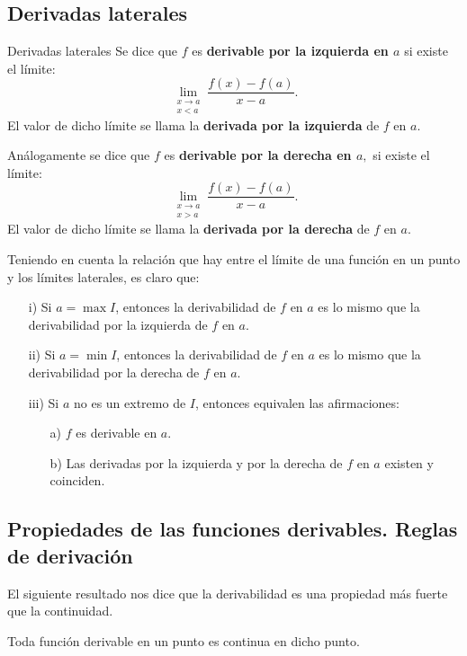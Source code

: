\subsection{Derivadas laterales}

\begin{defi}{Derivadas laterales}{} Se dice que $f$ es \textbf{derivable
por la izquierda en $a$} si existe el límite: 
\[
\lim_{\substack{x\to a\\
x<a
}
}\frac{f(x)-f(a)}{x-a}.
\]
El valor de dicho límite se llama la \textbf{derivada por la izquierda}
de $f$ en $a$.

Análogamente se dice que $f$ es \textbf{derivable por la derecha
en $a,$} si existe el límite: 
\[
\lim_{\substack{x\to a\\
x>a
}
}\frac{f(x)-f(a)}{x-a}.
\]
El valor de dicho límite se llama la \textbf{derivada por la derecha}
de $f$ en $a$. \end{defi}

Teniendo en cuenta la relación que hay entre el límite de una función
en un punto y los límites laterales, es claro que: 
\begin{itemize}
\item[i)] Si $a=\max I$, entonces la derivabilidad de $f$ en $a$ es lo mismo
que la derivabilidad por la izquierda de $f$ en $a$. 
\item[ii)] Si $a=\min I$, entonces la derivabilidad de $f$ en $a$ es lo mismo
que la derivabilidad por la derecha de $f$ en $a$. 
\item[iii)] Si $a$ no es un extremo de $I$, entonces equivalen las afirmaciones: 
\begin{itemize}
\item[a)] $f$ es derivable en $a$. 
\item[b)] Las derivadas por la izquierda y por la derecha de $f$ en $a$ existen
y coinciden. 
\end{itemize}
\end{itemize}

\subsection{Propiedades de las funciones derivables. Reglas de derivación}

El siguiente resultado nos dice que la derivabilidad es una propiedad
más fuerte que la continuidad.

\begin{proposicion}{}{} Toda función derivable en un punto es continua
en dicho punto. \end{proposicion}

